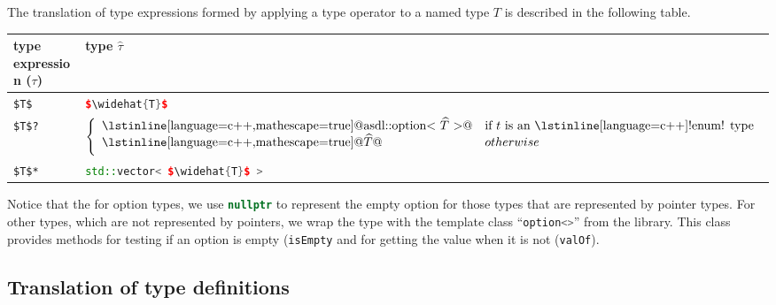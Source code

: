 The translation of \asdl{} type expressions formed by applying a type operator to
a named type $T$ is described in the following table.
%
\begin{center}
  \begin{tabular}{|p{2in}|p{3in}|}
    \hline
      \textbf{\asdl{} type expression ($\tau$)} &  \textbf{\Cplusplus{} type $\widehat{\tau}$} \\[0.25em]
    \hline
      \lstinline[language=ASDL,mathescape=true]@$T$@ & \lstinline[language=c++,mathescape=true]@$\widehat{T}$@ \\[0.5em]
      \lstinline[language=ASDL,mathescape=true]@$T$?@ &
        $\left\{
        \begin{array}{ll}
          \text{\lstinline[language=c++,mathescape=true]@asdl::option< $\widehat{T}$ >@}
            & \text{if $t$ is an \lstinline[language=c++]!enum! type} \\
          \text{\lstinline[language=c++,mathescape=true]@$\widehat{T}$@} & otherwise \\[0.5em]
        \end{array}
        \right.$ \\[0.5em]
      \lstinline[language=ASDL,mathescape=true]@$T$*@ & \lstinline[language=c++,mathescape=true]@std::vector< $\widehat{T}$ >@ \\[0.5em]
    \hline
  \end{tabular}%
\end{center}%
%
Notice that the for option types, we use \lstinline[language=c++]@nullptr@ to
represent the empty option for those \asdl{} types that are represented by
\Cplusplus{} pointer types.
For other \asdl{} types, which are not represented by pointers, we wrap the type
with the template class ``\lstinline[language=c++]@option<>@''
from the \asdl{} library.
This class provides methods for testing if an option is empty (\lstinline[language=c++]@isEmpty@
and for getting the value when it is not (\lstinline[language=c++]@valOf@).

\subsection{Translation of type definitions}

